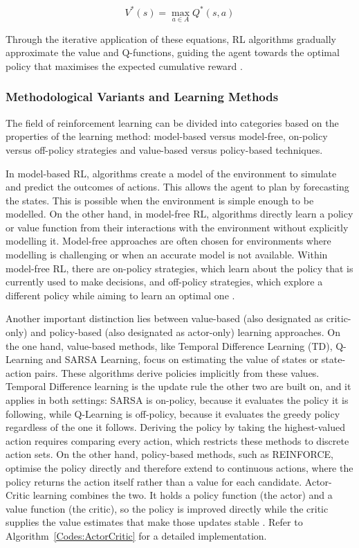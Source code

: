 \begin{equation}
V^*(s) = \max_{a \in A} Q^*(s, a)
\end{equation}

Through the iterative application of these equations, RL algorithms gradually approximate the value and Q-functions, guiding the agent towards the optimal policy that maximises the expected cumulative reward \cite{sutton_reinforcement_2018}.

\subsubsection{Methodological Variants and Learning Methods}

The field of reinforcement learning can be divided into categories based on the properties of the learning method: model-based versus model-free, on-policy versus off-policy strategies and value-based versus policy-based techniques.

In model-based RL, algorithms create a model of the environment to simulate and predict the outcomes of actions. This allows the agent to plan by forecasting the states. This is possible when the environment is simple enough to be modelled. On the other hand, in model-free RL, algorithms directly learn a policy or value function from their interactions with the environment without explicitly modelling it. Model-free approaches are often chosen for environments where modelling is challenging or when an accurate model is not available. Within model-free RL, there are on-policy strategies, which learn about the policy that is currently used to make decisions, and off-policy strategies, which explore a different policy while aiming to learn an optimal one \cite{sutton_reinforcement_2018}.

Another important distinction lies between value-based (also designated as critic-only) and policy-based (also designated as actor-only) learning approaches. On the one hand, value-based methods, like Temporal Difference Learning (TD), Q-Learning and SARSA Learning, focus on estimating the value of states or state-action pairs. These algorithms derive policies implicitly from these values. Temporal Difference learning is the update rule the other two are built on, and it applies in both settings: SARSA is on-policy, because it evaluates the policy it is following, while Q-Learning is off-policy, because it evaluates the greedy policy regardless of the one it follows. Deriving the policy by taking the highest-valued action requires comparing every action, which restricts these methods to discrete action sets. On the other hand, policy-based methods, such as REINFORCE, optimise the policy directly and therefore extend to continuous actions, where the policy returns the action itself rather than a value for each candidate. Actor-Critic learning combines the two. It holds a policy function (the actor) and a value function (the critic), so the policy is improved directly while the critic supplies the value estimates that make those updates stable \cite{sutton_reinforcement_2018}. Refer to Algorithm~\ref{Codes:ActorCritic} for a detailed implementation.

